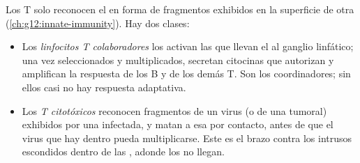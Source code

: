 \begin{proposition}\label{prop:g12:adaptive-immunity:tcells}
Los  T solo reconocen el  en forma de fragmentos
exhibidos en la superficie de otra 
(\cref{ch:g12:innate-immunity}). Hay dos clases:
\begin{itemize}
  \item Los \emph{linfocitos T colaboradores}
los activan las  que llevan el
         al ganglio linfático; una vez seleccionados y
        multiplicados, secretan citocinas que autorizan y amplifican la
        respuesta de los  B y de los demás  T. Son
        los coordinadores; sin ellos casi no hay respuesta adaptativa.
  \item Los \emph{ T citotóxicos} reconocen fragmentos de un
        virus (o de una  tumoral) exhibidos por una 
        infectada, y matan a esa  por contacto, antes de que el
        virus que hay dentro pueda multiplicarse. Este es el brazo
        contra los intrusos escondidos dentro de las , adonde
        los  no llegan.
\end{itemize}
\end{proposition}
\admitted

